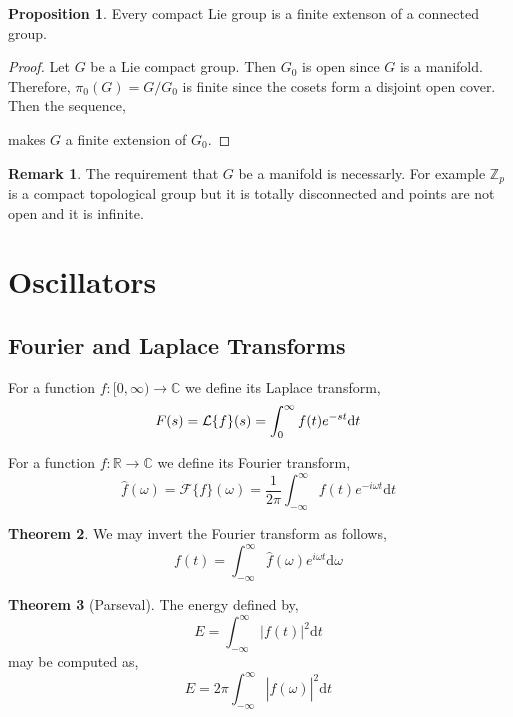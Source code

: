 \documentclass[12pt]{extarticle}
\newcommand{\Z}{\mathbb{Z}}
\newcommand{\R}{\mathbb{R}}
\renewcommand{\d}[1]{ \mathrm{d}#1 \:}
\theoremstyle{definition}
\newtheorem{theorem}{Theorem}[section]
\newtheorem{proposition}[theorem]{Proposition}
\newtheorem{remark}{Remark}
\newenvironment{definition}[1][Definition:]{\begin{trivlist}
\item[\hskip \labelsep {\bfseries #1}]}{\end{trivlist}}
\newcommand{\F}{\mathcal{F}}
\newcommand{\C}{\mathbb{C}}
\begin{document}
\begin{proposition}
Every compact Lie group is a finite extenson of a connected group. 
\end{proposition}

\begin{proof}
Let $G$ be a Lie compact group. Then $G_0$ is open since $G$ is a manifold. Therefore, $\pi_0(G) = G / G_0$ is finite since the cosets form a disjoint open cover. Then the sequence,
\begin{center}
\end{center}
makes $G$ a finite extension of $G_0$. 
\end{proof}

\begin{remark}
The requirement that $G$ be a manifold is necessarly. For example $\Z_p$ is a compact topological group but it is totally disconnected and points are not open and it is infinite. 
\end{remark}

\section{Oscillators}

\subsection{Fourier and Laplace Transforms}

\begin{definition}
For a function $f : [0,\infty) \to \C$ we define its Laplace transform,
\[ F(s) = \L\{ f \}(s) = \int_0^\infty f(t) e^{-st} \d{t} \] 
\end{definition}

\begin{definition}
For a function $f : \R \to \C$ we define its Fourier transform,
\[ \hat{f}(\omega) = \F\{ f \}(\omega) = \frac{1}{2 \pi} \int_{-\infty}^\infty f(t) e^{-i \omega t} \d{t} \] 
\end{definition}

\begin{theorem}
We may invert the Fourier transform as follows,
\[ f(t) = \int^{\infty}_{-\infty} \hat{f}(\omega) e^{i \omega t} \d{\omega} \]
\end{theorem}


\begin{theorem}[Parseval]
The energy defined by,
\[ E = \int_{-\infty}^\infty |f(t)|^2 \d{t} \]
may be computed as,
\[ E = 2\pi \int_{-\infty}^\infty |\hat{f}(\omega)|^2 \d{t} \]
\end{theorem}
\end{document}
